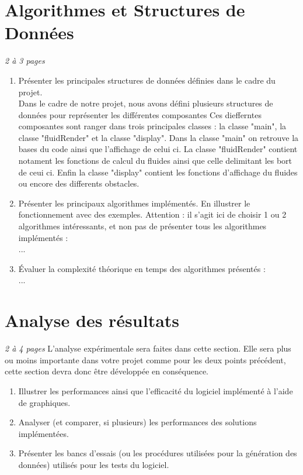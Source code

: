 \documentclass[a4paper]{article}
\begin{document}
\section{Algorithmes et Structures de Données}
\emph{2 à 3 pages}
\begin{enumerate}%
\item 	Présenter les principales structures de données définies dans le cadre du projet.\\
      Dans le cadre de notre projet, nous avons défini plusieurs structures de données pour représenter les différentes composantes
      Ces diefferntes composantes sont ranger dans trois principales classes : 
      la classe "main", la classe "fluidRender" et la classe "display".
      Dans la classe "main" on retrouve la bases du code ainsi que l'affichage
      de celui ci.
      La classe "fluidRender" contient notament les fonctions de calcul du fluides
      ainsi que celle delimitant les bort de ceui ci.
      Enfin la classe "display" contient les fonctions d'affichage du fluides ou encore 
      des differents obstacles.
\item 	Présenter les principaux algorithmes implémentés. En illustrer le fonctionnement avec des exemples. 
Attention : il s'agit ici de choisir 1 ou 2 algorithmes intéressants, et non pas de présenter tous les algorithmes implémentés : \\
...
\item 	Évaluer la complexité théorique en temps des algorithmes présentés :\\
...
\end{enumerate}

\section{Analyse des résultats }
\emph{2 à 4 pages}
L'analyse expérimentale sera faites dans cette section.   Elle sera plus ou moins importante dans votre projet comme pour les deux points précédent, cette section devra donc être développée en conséquence.

\begin{enumerate}%
\item 	Illustrer les performances ainsi que l'efficacité du logiciel implémenté à l'aide de graphiques.
\item Analyser (et comparer, si plusieurs) les performances des solutions implémentées.
\item	Présenter les bancs d'essais (ou les procédures utilisées pour la génération des données) utilisés pour les tests du logiciel.
\end{enumerate}
\end{document}
